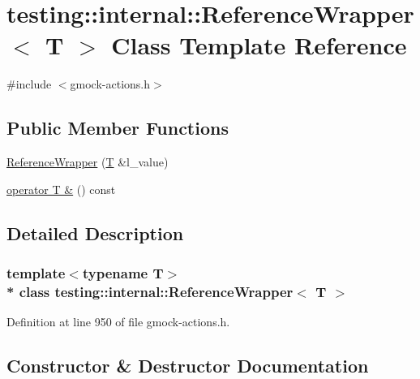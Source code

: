 \hypertarget{classtesting_1_1internal_1_1_reference_wrapper}{}\section{testing\+:\+:internal\+:\+:Reference\+Wrapper$<$ T $>$ Class Template Reference}
\label{classtesting_1_1internal_1_1_reference_wrapper}


{\ttfamily \#include $<$gmock-\/actions.\+h$>$}

\subsection*{Public Member Functions}
\begin{DoxyCompactItemize}
\item 
\hyperlink{classtesting_1_1internal_1_1_reference_wrapper_ad33597ffc478c3af9190d1a288a76d39}{Reference\+Wrapper} (\hyperlink{functions__7_8js_adf1f3edb9115acb0a1e04209b7a9937b}{T} \&l\+\_\+value)
\item 
\hyperlink{classtesting_1_1internal_1_1_reference_wrapper_ac9a45f88ba592f05b0c0c90103812872}{operator T \&} () const 
\end{DoxyCompactItemize}


\subsection{Detailed Description}
\subsubsection*{template$<$typename T$>$\\*
class testing\+::internal\+::\+Reference\+Wrapper$<$ T $>$}



Definition at line 950 of file gmock-\/actions.\+h.



\subsection{Constructor \& Destructor Documentation}
